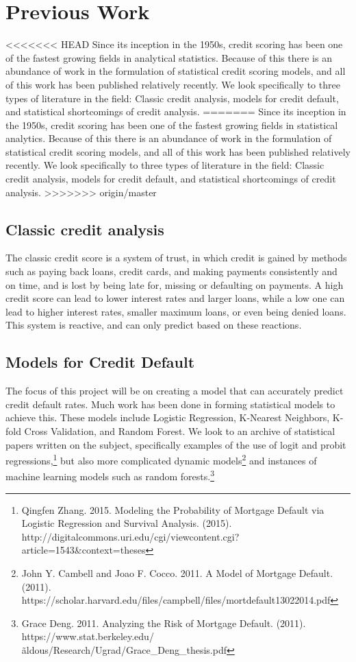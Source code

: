 \documentclass[sigconf, 11pt]{acmart}
\begin{document}
\section{Previous Work}
<<<<<<< HEAD
Since its inception in the 1950s, credit scoring has been one of the fastest growing fields	in analytical statistics. Because of this there is an abundance of work in the formulation of statistical credit scoring models, and all of this work has been published relatively recently. We look specifically to three types of literature in the field: Classic credit analysis, models for credit default, and statistical shortcomings of credit analysis.
=======
Since its inception in the 1950s, credit scoring has been one of the fastest growing fields	 in statistical analytics. Because of this there is an abundance of work in the formulation of statistical credit scoring models, and all of this work has been published relatively recently. We look specifically to three types of literature in the field: Classic credit analysis, models for credit default, and statistical shortcomings of credit analysis.
>>>>>>> origin/master

\subsection{Classic credit analysis}
The classic credit score is a system of trust, in which credit is gained by methods such as paying back loans, credit cards, and making payments consistently and on time, and is lost by being late for, missing or defaulting on payments. A high credit score can lead to lower interest rates and larger loans, while a low one can lead to higher interest rates, smaller maximum loans, or even being denied loans. This system is reactive, and can only predict based on these reactions.

\subsection{Models for Credit Default}
The focus of this project will be on creating a model that can accurately predict credit default rates. Much work has been done in forming statistical models to achieve this. These models include Logistic Regression, K-Nearest Neighbors, K-fold Cross Validation, and Random Forest. We look to an archive of statistical papers written on the subject, specifically examples of the use of logit and probit regressions,\footnote{Qingfen Zhang. 2015. Modeling the Probability of Mortgage Default via Logistic Regression and Survival Analysis. (2015). http://digitalcommons.uri.edu/cgi/viewcontent.cgi?article=1543\&context=theses} but also more complicated dynamic models\footnote{John Y. Cambell and Joao F. Cocco. 2011. A Model of Mortgage Default. (2011). https://scholar.harvard.edu/files/campbell/files/mortdefault13022014.pdf} and instances of machine learning models such as random forests.\footnote{Grace Deng. 2011. Analyzing the Risk of Mortgage Default. (2011). https://www.stat.berkeley.edu/\~aldous/Research/Ugrad/Grace\_Deng\_thesis.pdf}
\end{document}
